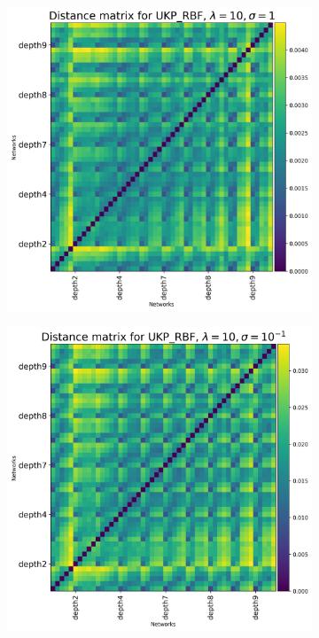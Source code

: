\documentclass{article}
\theoremstyle{plain}
\begin{document}
\begin{figure}[!h]
    \begin{subfigure}[b]{0.3\textwidth}
        \includegraphics[width=\textwidth]{Appendix figures/mnist_experiments/Heatmaps/Heatmap for UKP_dist_RBF_1.000000e+01_1.000000e+00.png}
    \end{subfigure}
    \hfill
    \begin{subfigure}[b]{0.3\textwidth}
        \includegraphics[width=\textwidth]{Appendix figures/mnist_experiments/Heatmaps/Heatmap for UKP_dist_RBF_1.000000e+01_1.000000e-01.png}

\end{subfigure}
\end{figure}
\end{document}
